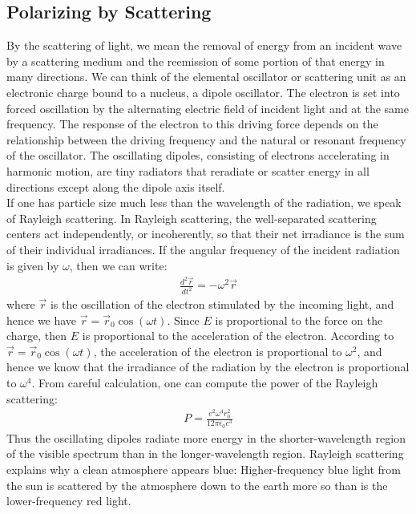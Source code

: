 \documentclass[11pt]{book}
\theoremstyle{break}
\theoremstyle{break}
\begin{document}
\subsection{Polarizing by Scattering}
By the scattering of light, we mean the removal of energy from an incident
wave by a scattering medium and the reemission of some portion of that energy in many directions. We can think of the elemental oscillator or scattering unit as an electronic charge bound to a nucleus, a dipole oscillator. The electron is set into forced oscillation by the alternating electric field of incident light and at the same frequency. The response of the electron to this driving force depends on the relationship between the driving frequency and the natural or resonant frequency of the oscillator. The oscillating dipoles, consisting of electrons accelerating in harmonic motion, are tiny radiators that reradiate or scatter energy in all directions except along the dipole axis itself.\\

If one has particle size much less than the wavelength of the radiation, we speak of Rayleigh scattering. In Rayleigh scattering, the well-separated scattering centers act independently, or incoherently, so that their net
irradiance is the sum of their individual irradiances. If the angular frequency of the incident radiation is given by $\omega$, then we can write:
\begin{align*}
\frac{d^2 \vec{r}}{dt^2} = -\omega^2 \vec{r}
\end{align*}
where $\vec{r}$ is the oscillation of the electron stimulated by the incoming light, and hence we have $\vec{r} = \vec{r}_0 \cos(\omega t)$. Since $E$ is proportional to the force on the charge, then $E$ is proportional to the acceleration of the electron. According to $\vec{r} = \vec{r}_0 \cos(\omega t)$, the acceleration of the electron is proportional to $\omega^2$, and hence we know that the irradiance of the radiation by the electron is proportional to $\omega^4$. From careful calculation, one can compute the power of the Rayleigh scattering:
\begin{align*}
P = \frac{e^2 \omega^4 r_0^2}{12 \pi \epsilon_0 c^3}
\end{align*}
Thus the oscillating dipoles radiate more energy in the shorter-wavelength  region of the visible spectrum than in the longer-wavelength region. Rayleigh
scattering explains why a clean atmosphere appears blue: Higher-frequency blue light from the sun is scattered by the atmosphere down to the earth more so than is the lower-frequency red light.\\
\end{document}
